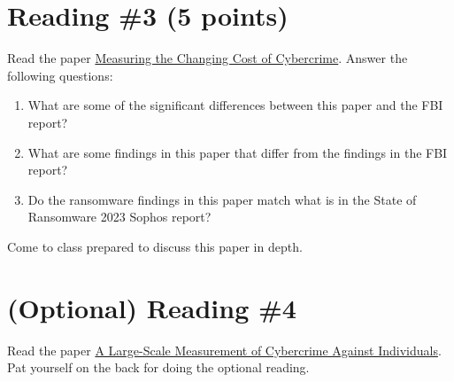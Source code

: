 \documentclass[11pt]{article}
\begin{document}
\section*{Reading \#3 (5 points)}

Read the paper \href{https://orca.cardiff.ac.uk/id/eprint/122684/}{Measuring the Changing Cost of Cybercrime}.
Answer the following questions:
\begin{enumerate}
    \item What are some of the significant differences between this paper and the FBI report?
    \item What are some findings in this paper that differ from the findings in the FBI report? 
    \item Do the ransomware findings in this paper match what is in the State of Ransomware 2023 Sophos report?
\end{enumerate}

Come to class prepared to discuss this paper in depth.

\section*{(Optional) Reading \#4}

Read the paper \href{https://dl.acm.org/doi/abs/10.1145/3491102.3517613}{A Large-Scale Measurement of Cybercrime Against Individuals}. Pat yourself on the back for doing the optional reading.
\end{document}
